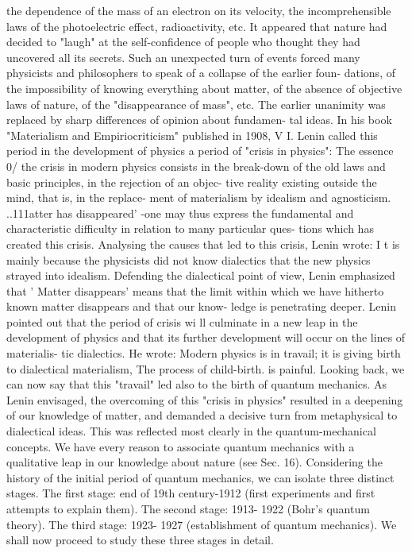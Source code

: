 \documentclass[a4paper,sfsidenotes,colorlinks=true]{tufte-book}
\numberwithin{equation}{section}
\numberwithin{figure}{section}
\begin{document}
{{{{{{the dependence of the mass of an electron on its velocity, the incomprehensible laws of the photoelectric effect, radioactivity, etc. It appeared that nature had decided to "laugh" at the self-confidence of people who thought they had uncovered all its secrets.
Such an unexpected turn of events forced many physicists and philosophers to speak of a collapse of the earlier foun- dations, of the impossibility of knowing everything about matter, of the absence of objective laws of nature, of the "disappearance of mass", etc. The earlier unanimity was replaced by sharp differences of opinion about fundamen-
tal ideas. In his book "Materialism and Empiriocriticism" published in 1908, V I. Lenin called this period in the development of physics a period of "crisis in physics": The essence 0/ the crisis in modern physics consists in the break-down of the old laws and basic principles, in the rejection of an objec- tive reality existing outside the mind, that is, in the replace- ment of materialism by idealism and agnosticism. ..111atter has disappeared' -one may thus express the fundamental and characteristic difficulty in relation to many particular ques-
tions which has created this crisis.
Analysing the causes that led to this crisis, Lenin wrote:
I t is mainly because the physicists did not know dialectics that the new physics strayed into idealism. Defending the dialectical point of view, Lenin emphasized that ' Matter disappears' means that the limit within which we have hitherto known matter disappears and that our know- ledge is penetrating deeper.
Lenin pointed out that the period of crisis wi ll culminate in a new leap in the development of physics and that its further development will occur on the lines of materialis- tic dialectics. He wrote: Modern physics is in travail; it is giving birth to dialectical materialism, The process of child-birth. is painful.
Looking back, we can now say that this "travail" led also to the birth of quantum mechanics. As Lenin envisaged, the overcoming of this "crisis in physics" resulted in a deepening of our knowledge of matter, and demanded a decisive turn from metaphysical to dialectical ideas. This
was reflected most clearly in the quantum-mechanical concepts. We have every reason to associate quantum mechanics with a qualitative leap in our knowledge about nature (see Sec. 16).
Considering the history of the initial period of quantum mechanics, we can isolate three distinct stages. The first stage: end of 19th century-1912 (first experiments and first attempts to explain them). The second stage: 1913- 1922 (Bohr's quantum theory). The third stage: 1923- 1927 (establishment of quantum mechanics). We shall now proceed to study these three stages in detail.
}}}}}}
\end{document}
